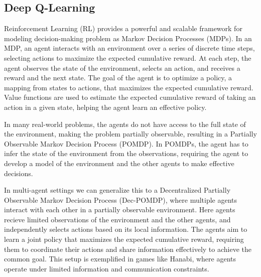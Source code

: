 \subsection{Deep Q-Learning}
Reinforcement Learning (RL) provides a powerful and scalable framework for modeling decision-making problem as Markov Decision Processes (MDPs). In an MDP, an agent interacts with an environment over a series of discrete time steps, selecting actions to maximize the expected cumulative reward. At each step, the agent observes the state of the environment, selects an action, and receives a reward and the next state. The goal of the agent is to optimize a policy, a mapping from states to actions, that maximizes the expected cumulative reward. Value functions are used to estimate the expected cumulative reward of taking an action in a given state, helping the agent learn an effective policy.

In many real-world problems, the agents do not have access to the full state of the environment, making the problem partially observable, resulting in a Partially Observable Markov Decision Process (POMDP). In POMDPs, the agent has to infer the state of the environment from the observations, requiring the agent to develop a model of the environment and the other agents to make effective decisions.

In multi-agent settings we can generalize this to a Decentralized Partially Observable Markov Decision Process (Dec-POMDP), where multiple agents interact with each other in a partially observable environment. Here agents recieve limited observations of the environment and the other agents, and independently selects actions based on its local information. The agents aim to learn a joint policy that maximizes the expected cumulative reward, requiring them to coordinate their actions and share information effectively to achieve the common goal. This setup is exemplified in games like Hanabi, where agents operate under limited information and communication constraints.

